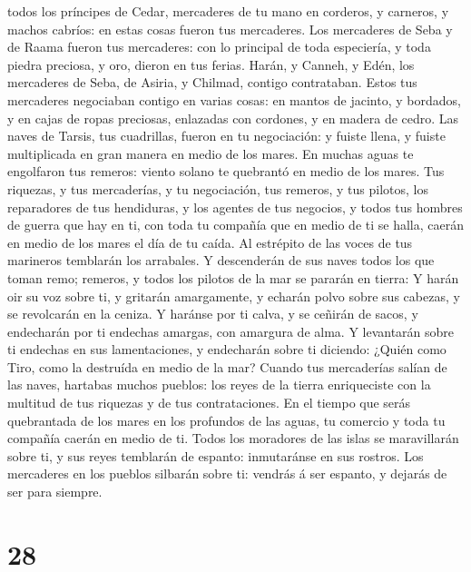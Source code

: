 todos los príncipes de Cedar, mercaderes de tu mano en corderos, y
carneros, y machos cabríos: en estas cosas fueron tus mercaderes.
 Los mercaderes de Seba y de Raama fueron tus mercaderes:
con lo principal de toda especiería, y toda piedra preciosa, y oro,
dieron en tus ferias.  Harán, y Canneh, y Edén, los
mercaderes de Seba, de Asiria, y Chilmad, contigo contrataban.
 Estos tus mercaderes negociaban contigo en varias cosas:
en mantos de jacinto, y bordados, y en cajas de ropas preciosas,
enlazadas con cordones, y en madera de cedro.  Las naves de
Tarsis, tus cuadrillas, fueron en tu negociación: y fuiste llena, y
fuiste multiplicada en gran manera en medio de los mares. 
En muchas aguas te engolfaron tus remeros: viento solano te quebrantó en
medio de los mares.  Tus riquezas, y tus mercaderías, y tu
negociación, tus remeros, y tus pilotos, los reparadores de tus
hendiduras, y los agentes de tus negocios, y todos tus hombres de guerra
que hay en ti, con toda tu compañía que en medio de ti se halla, caerán
en medio de los mares el día de tu caída.  Al estrépito de
las voces de tus marineros temblarán los arrabales.  Y
descenderán de sus naves todos los que toman remo; remeros, y todos los
pilotos de la mar se pararán en tierra:  Y harán oir su voz
sobre ti, y gritarán amargamente, y echarán polvo sobre sus cabezas, y
se revolcarán en la ceniza.  Y haránse por ti calva, y se
ceñirán de sacos, y endecharán por ti endechas amargas, con amargura de
alma.  Y levantarán sobre ti endechas en sus lamentaciones,
y endecharán sobre ti diciendo: ¿Quién como Tiro, como la destruída en
medio de la mar?  Cuando tus mercaderías salían de las
naves, hartabas muchos pueblos: los reyes de la tierra enriqueciste con
la multitud de tus riquezas y de tus contrataciones.  En el
tiempo que serás quebrantada de los mares en los profundos de las aguas,
tu comercio y toda tu compañía caerán en medio de ti. 
Todos los moradores de las islas se maravillarán sobre ti, y sus reyes
temblarán de espanto: inmutaránse en sus rostros.  Los
mercaderes en los pueblos silbarán sobre ti: vendrás á ser espanto, y
dejarás de ser para siempre.

\hypertarget{section-27}{%
\section{28}\label{section-27}}

